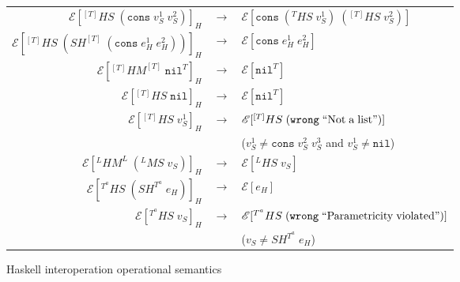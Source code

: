 \begin{figure}
\begin{center}
\begin{tabular}{rcl}
$\mathscr{E}[^{[T]}HS\;(\mathtt{cons}\;v_{S}^{1}\;v_{S}^{2})]_{H}$ & $\rightarrow$ & $\mathscr{E}[\mathtt{cons}\;(^{T}HS\;v_{S}^{1})\;(^{[T]}HS\;v_{S}^{2})]$ \\
$\mathscr{E}[^{[T]}HS\;(SH^{[T]}\;(\mathtt{cons}\;e_{H}^{1}\;e_{H}^{2}))]_{H}$ & $\rightarrow$ & $\mathscr{E}[\mathtt{cons}\;e_{H}^{1}\;e_{H}^{2}]$ \\
$\mathscr{E}[^{[T]}HM^{[T]}\;\mathtt{nil}^{T}]_{H}$ & $\rightarrow$ & $\mathscr{E}[\mathtt{nil}^{T}]$ \\
$\mathscr{E}[^{[T]}HS\;\mathtt{nil}]_{H}$ & $\rightarrow$ & $\mathscr{E}[\mathtt{nil}^{T}]$ \\
$\mathscr{E}[^{[T]}HS\;v_{S}^{1}]_{H}$ & $\rightarrow$ & $\mathscr{E}[^{[T]}HS\;(\mathtt{wrong}\;\mathrm{``Not\;a\;list"})]$ \\
&& ($v_{S}^{1}\neq\mathtt{cons}\;v_{S}^{2}\;v_{S}^{3}$ and $v_{S}^{1}\neq\mathtt{nil}$) \\
$\mathscr{E}[^{L}HM^{L}\;(^{L}MS\;v_{S})]_{H}$ & $\rightarrow$ & $\mathscr{E}[^{L}HS\;v_{S}]$ \\
$\mathscr{E}[^{T^{a}}HS\;(SH^{T^{a}}\;e_{H})]_{H}$ & $\rightarrow$ & $\mathscr{E}[e_{H}]$ \\
$\mathscr{E}[^{T^{a}}HS\;v_{S}]_{H}$ & $\rightarrow$ & $\mathscr{E}[^{T^{a}}HS\;(\mathtt{wrong}\;\mathrm{``Parametricity\;violated"})]$ \\
&& ($v_{S}\neq SH^{T^{a}}\;e_{H}$)
\end{tabular}
\end{center}
\caption{Haskell interoperation operational semantics}
\label{fig:hios}
\end{figure}